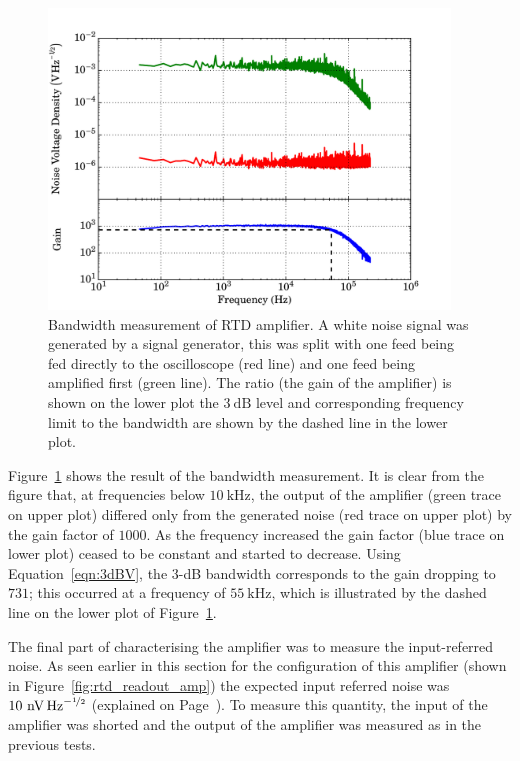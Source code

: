 \begin{figure}[t]
\begin{center}
\includegraphics[width = 0.95\textwidth]{figures/RTD_amp_BW}
\caption[Bandwidth measurement of original amplifier]{Bandwidth measurement of RTD amplifier. A white noise signal was generated by a signal generator, this was split with one feed being fed directly to the oscilloscope (red line) and one feed being amplified first (green line). The ratio (the gain of the amplifier) is shown on the lower plot the $3~\mathrm{dB}$ level and corresponding frequency limit to the bandwidth are shown by the dashed line in the lower plot.}
\label{fig:RTD_amp_BW}
\end{center}
\end{figure}
\par 
Figure~\ref{fig:RTD_amp_BW} shows the result of the bandwidth measurement. It is clear from the figure that, at frequencies below $10~\mathrm{kHz}$, the output of the amplifier (green trace on upper plot) differed only from the generated noise (red trace on upper plot) by the gain factor of $1000$. As the frequency increased the gain factor (blue trace on lower plot) ceased to be constant and started to decrease. Using Equation~\ref{eqn:3dBV}, the 3-dB bandwidth corresponds to the gain dropping to $731$; this occurred at a frequency of $55~\mathrm{kHz}$\label{res:RTD_amp_BW}, which is illustrated by the dashed line on the lower plot of Figure~\ref{fig:RTD_amp_BW}.
\par 
The final part of characterising the amplifier was to measure the input-referred noise. As seen earlier in this section for the configuration of this amplifier (shown in Figure~\ref{fig:rtd_readout_amp}) the expected input referred noise was $10~\mathrm{nV\,Hz}^{-\nicefrac{1}{2}}$ (explained on Page~\pageref{res:RTD_amp_noise}). To measure this quantity, the input of the amplifier was shorted and the output of the amplifier was measured as in the previous tests.
